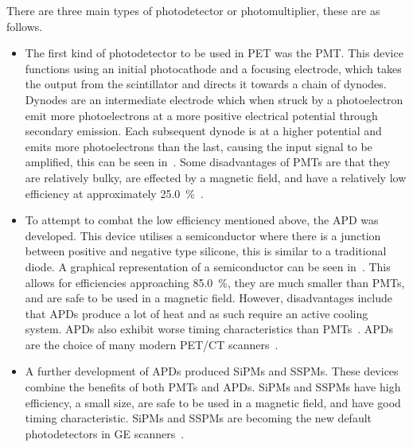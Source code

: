                 There are three main types of photodetector or photomultiplier, these are as follows.
                
                \begin{itemize}
                    \item The first kind of photodetector to be used in \gls{PET} was the \gls{PMT}. This device functions using an initial photocathode and a focusing electrode, which takes the output from the scintillator and directs it towards a chain of dynodes. Dynodes are an intermediate electrode which when struck by a photoelectron emit more photoelectrons at a more positive electrical potential through secondary emission. Each subsequent dynode is at a higher potential and emits more photoelectrons than the last, causing the input signal to be amplified, this can be seen in~. Some disadvantages of \glspl{PMT} are that they are relatively bulky, are effected by a magnetic field, and have a relatively low efficiency at approximately \SI{25.0}{\percent}~\parencite{petspringer, SiPmBib}.
                    
                    \item To attempt to combat the low efficiency mentioned above, the \gls{APD} was developed. This device utilises a semiconductor where there is a junction between positive and negative type silicone, this is similar to a traditional diode. A graphical representation of a semiconductor can be seen in~. This allows for efficiencies approaching \SI{85.0}{\percent}, they are much smaller than \glspl{PMT}, and are safe to be used in a magnetic field. However, disadvantages include that \glspl{APD} produce a lot of heat and as such require an active cooling system. \glspl{APD} also exhibit worse timing characteristics than \glspl{PMT}~\parencite{AvalanchePhotodiodeBib}. \glspl{APD} are the choice of many modern \gls{PET}/\gls{CT} scanners~\parencite{Vandendriessche2019}.
                    
                    \item A further development of \glspl{APD} produced \glspl{SiPM} and \glspl{SSPM}. These devices combine the benefits of both \glspl{PMT} and \glspl{APD}. \glspl{SiPM} and \glspl{SSPM} have high efficiency, a small size, are safe to be used in a magnetic field, and have good timing characteristic. \glspl{SiPM} and \glspl{SSPM} are becoming the new default photodetectors in \gls{GE} scanners~\parencite{SiPmBib}.
                \end{itemize}
            
